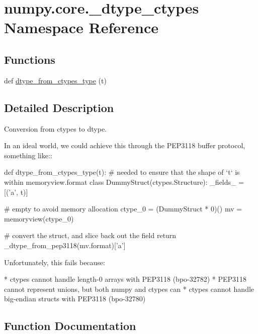 \hypertarget{namespacenumpy_1_1core_1_1__dtype__ctypes}{}\section{numpy.\+core.\+\_\+dtype\+\_\+ctypes Namespace Reference}
\label{namespacenumpy_1_1core_1_1__dtype__ctypes}
\subsection*{Functions}
\begin{DoxyCompactItemize}
\item 
def \hyperlink{namespacenumpy_1_1core_1_1__dtype__ctypes_a85d29533d3118c96aaabaf3580c30ae0}{dtype\+\_\+from\+\_\+ctypes\+\_\+type} (t)
\end{DoxyCompactItemize}


\subsection{Detailed Description}
\begin{DoxyVerb}Conversion from ctypes to dtype.

In an ideal world, we could achieve this through the PEP3118 buffer protocol,
something like::

def dtype_from_ctypes_type(t):
    # needed to ensure that the shape of `t` is within memoryview.format
    class DummyStruct(ctypes.Structure):
        _fields_ = [('a', t)]

    # empty to avoid memory allocation
    ctype_0 = (DummyStruct * 0)()
    mv = memoryview(ctype_0)

    # convert the struct, and slice back out the field
    return _dtype_from_pep3118(mv.format)['a']

Unfortunately, this fails because:

* ctypes cannot handle length-0 arrays with PEP3118 (bpo-32782)
* PEP3118 cannot represent unions, but both numpy and ctypes can
* ctypes cannot handle big-endian structs with PEP3118 (bpo-32780)
\end{DoxyVerb}
 

\subsection{Function Documentation}
\mbox{\label{namespacenumpy_1_1core_1_1__dtype__ctypes_a85d29533d3118c96aaabaf3580c30ae0}} 
